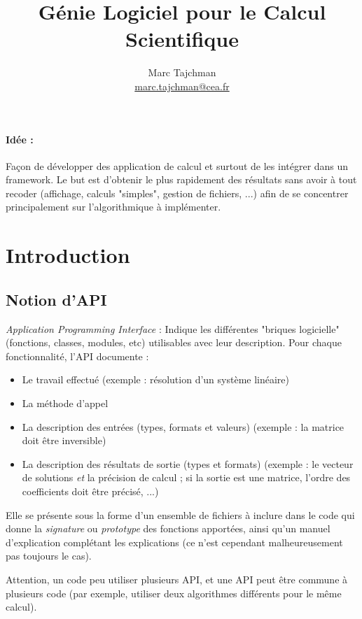 \documentclass{article}
\title{Génie Logiciel pour le Calcul Scientifique}
\author{Marc Tajchman\\
\url{marc.tajchman@cea.fr}}
\date{}
\begin{document}
\maketitle
\tableofcontents
\newpage

\paragraph{Idée :} Façon de développer des application de calcul et surtout de les intégrer dans un framework. Le but est d'obtenir le plus rapidement des résultats sans avoir à tout recoder (affichage, calculs "simples", gestion de fichiers, ...) afin de se concentrer principalement sur l'algorithmique à implémenter.

\section{Introduction}

\subsection{Notion d'API}
\emph{Application Programming Interface} : Indique les différentes "briques logicielle" (fonctions, classes, modules, etc) utilisables avec leur description. Pour chaque fonctionnalité, l'API documente :
\begin{itemize}
\item Le travail effectué (exemple : résolution d'un système linéaire)
\item La méthode d'appel
\item La description des entrées (types, formats et valeurs) (exemple : la matrice doit être inversible)
\item La description des résultats de sortie (types et formats) (exemple : le vecteur de solutions \emph{et} la précision de calcul ; si la sortie est une matrice, l'ordre des coefficients doit être précisé, ...)
\end{itemize}
\bigskip

Elle se présente sous la forme d'un ensemble de fichiers à inclure dans le code qui donne la \emph{signature} ou \emph{prototype} des fonctions apportées, ainsi qu'un manuel d'explication complétant les explications (ce n'est cependant malheureusement pas toujours le cas).

Attention, un code peu utiliser plusieurs API, et une API peut être commune à plusieurs code (par exemple, utiliser deux algorithmes différents pour le même calcul).
\end{document}
